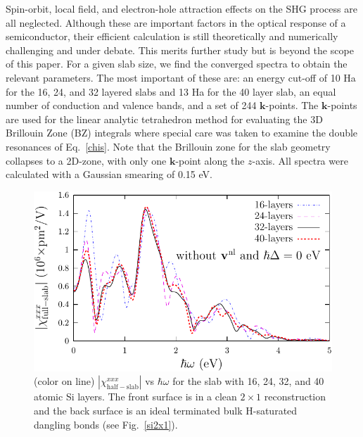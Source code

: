 Spin-orbit, local field, and electron-hole attraction\cite{beyond} effects on
the SHG process are all neglected. Although these are important factors in the
optical response of a semiconductor, their efficient calculation is still
theoretically and numerically challenging and under debate. This merits further
study but is beyond the scope of this paper. For a given slab size, we find the
converged spectra to obtain the relevant parameters. The most important of these
are: an energy cut-off of 10 Ha for the 16, 24, and 32 layered slabs and 13 Ha
for the 40 layer slab, an equal number of conduction and valence bands, and a
set of 244 $\mathbf{k}$-points. The $\mathbf{k}$-points are used for the linear
analytic tetrahedron method for evaluating the 3D Brillouin Zone (BZ) integrals
where special care was taken to examine the double resonances of
Eq.~\eqref{chis}. \cite{nastosPRB05} Note that the Brillouin zone for the slab
geometry collapses to a 2D-zone, with only one $\mathbf{k}$-point along the
$z$-axis. All spectra were calculated with a Gaussian smearing of 0.15 eV.
\begin{figure}
\centering 
\includegraphics[scale=.8]{figures/03-results/chi2/fig3}
\caption{(color on line) 
$|\chi_{\mathrm{half-slab}}^{xxx}|$ vs $\hbar\omega$ for the slab with 16, 24,
32, and 40 atomic Si layers. The front surface is in a clean $2\times 1$
reconstruction and the back surface is an ideal terminated bulk H-saturated
dangling bonds (see Fig.~\ref{si2x1}).
\label{fig1}} 
\end{figure}
